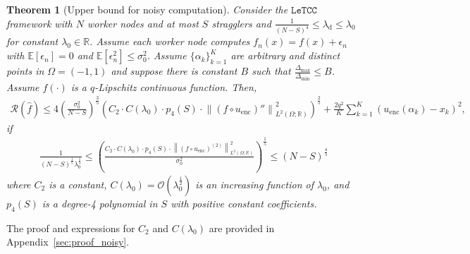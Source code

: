 \documentclass{article}
\newtheorem{theorem}{Theorem}
\def\encs{u_\textrm{enc}}
\def\declamb{\lambda_\textrm{d}}
\def\nprcc{\texttt{LeTCC}}
\newcommand{\norm}[1]{\left\lVert#1\right\rVert}
\newcommand{\lp}[1]{{L}^{#1}\left(\Omega; \mathbb{R}\right)}
\begin{document}
\begin{theorem}[Upper bound for noisy computation]\label{th:conv_rate_noisy}
Consider the $\nprcc$ framework with $N$ worker nodes and at most $S$ stragglers and $\frac{1}{(N-S)^4}\leqslant \declamb \leqslant \lambda_0$ for constant $\lambda_0\in \mathbb{R}$. Assume each worker node computes %
$f_n(x) = f(x) + \epsilon_n$ 
with $\mathbb{E}[\epsilon_n] = 0$ and $\mathbb{E}[\epsilon_n^2] \leqslant \sigma_0^2$.
Assume $\{\alpha_k\}^K_{k=1}$ are arbitrary and distinct points in $\Omega=(-1, 1)$ and suppose there is  constant $B$ such that $\frac{\Delta_{\textrm{max}}}{\Delta_{\textrm{min}}} \leqslant B$. Assume $f(\cdot)$ is a $q$-Lipschitz continuous function. Then,  
\begin{align}\label{eq:th1}
    \mathcal{R}(\hat{f}) \leqslant 4
    \left(\frac{\sigma^2_0}{N-S}\right)^{\frac{3}{5}} 
    \left(C_2\cdot C(\lambda_0)\cdot p_4(S) \cdot
    \norm{(f \circ \encs)''}^{2}_{\lp{2}}\right)^{\frac{2}{5}} + \frac{2q^2}{K} \sum^K_{k=1} (\encs(\alpha_k) - x_k)^2,
\end{align}
if
\begin{align}\label{eq:th2_opt_lambda}
    \frac{1}{(N-S)^\frac{1}{5}\lambda^\frac{1}{4}_0}\leqslant \left(\frac{C_2\cdot C(\lambda_0)\cdot p_4(S)\cdot\norm{(f\circ\encs)^{(2)}}^2_{\lp{2}}}{\sigma^2_0}\right)^\frac{1}{5} \leqslant (N-S)^\frac{4}{5}
\end{align}
where $C_2$ is a constant, $C(\lambda_0) = \mathcal{O}(\lambda_0^{\frac{1}{2}})$ is an increasing function of $\lambda_0$, and $p_4(S)$ is a degree-4 polynomial in $S$ with positive constant coefficients.
\end{theorem}

The proof and expressions for $C_2$ and $C(\lambda_0)$ are provided in Appendix~\ref{sec:proof_noisy}.
\end{document}
